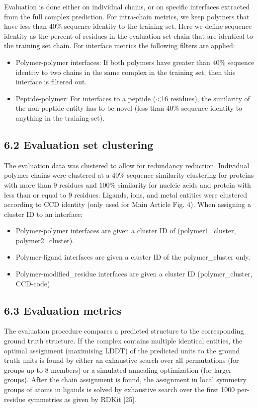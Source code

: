 \documentclass[10pt]{article}
\begin{document}
Evaluation is done either on individual chains, or on specific interfaces extracted from the full complex prediction. For intra-chain metrics, we keep polymers that have less than $40 \%$ sequence identity to the training set. Here we define sequence identity as the percent of residues in the evaluation set chain that are identical to the training set chain. For interface metrics the following filters are applied:

\begin{itemize}
  \item Polymer-polymer interfaces: If both polymers have greater than $40 \%$ sequence identity to two chains in the same complex in the training set, then this interface is filtered out.
  \item Peptide-polymer: For interfaces to a peptide (<16 residues), the similarity of the non-peptide entity has to be novel (less than $40 \%$ sequence identity to anything in the training set).
\end{itemize}

\subsection*{6.2 Evaluation set clustering}
The evaluation data was clustered to allow for redundancy reduction. Individual polymer chains were clustered at a $40 \%$ sequence similarity clustering for proteins with more than 9 residues and $100 \%$ similarity for nucleic acids and protein with less than or equal to 9 residues. Ligands, ions, and metal entities were clustered according to CCD identity (only used for Main Article Fig. 4). When assigning a cluster ID to an interface:

\begin{itemize}
  \item Polymer-polymer interfaces are given a cluster ID of (polymer1\_cluster, polymer2\_cluster).
  \item Polymer-ligand interfaces are given a cluster ID of the polymer\_cluster only.
  \item Polymer-modified\_residue interfaces are given a cluster ID (polymer\_cluster, CCD-code).
\end{itemize}

\subsection*{6.3 Evaluation metrics}
The evaluation procedure compares a predicted structure to the corresponding ground truth structure. If the complex contains multiple identical entities, the optimal assignment (maximising LDDT) of the predicted units to the ground truth units is found by either an exhaustive search over all permutations (for groups up to 8 members) or a simulated annealing optimization (for larger groups). After the chain assignment is found, the assignment in local symmetry groups of atoms in ligands is solved by exhaustive search over the first 1000 per-residue symmetries as given by RDKit [25].
\end{document}
